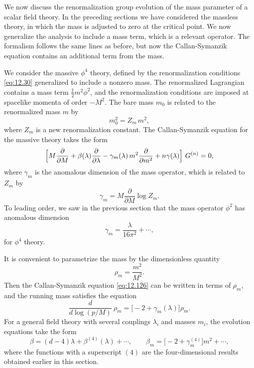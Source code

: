 We now discuss the renormalization group evolution of the mass parameter of a
scalar field theory.  In the preceding sections we have considered the
massless theory, in which the mass is adjusted to zero at the critical point.
We now generalize the analysis to include a mass term, which is a relevant
operator.  The formalism follows the same lines as before, but now the
Callan-Symanzik equation contains an additional term from the mass.

We consider the massive $\phi^4$ theory, defined by the renormalization
conditions \eqref{eq:12.30} generalized to include a nonzero mass.  The
renormalized Lagrangian contains a mass term $\tfrac{1}{2}m^2\phi^2$, and the
renormalization conditions are imposed at spacelike momenta of order $-M^2$.
The bare mass $m_0$ is related to the renormalized mass $m$ by
\begin{equation}
  m_0^2 = Z_m\,m^2 ,
\end{equation}
where $Z_m$ is a new renormalization constant.  The Callan-Symanzik equation
for the massive theory takes the form
\begin{equation}
  \Bigl[ M\frac{\partial}{\partial M} + \beta(\lambda)\frac{\partial}
    {\partial\lambda} - \gamma_m(\lambda)\,m^2\frac{\partial}{\partial m^2}
    + n\gamma(\lambda) \Bigr]\ G^{(n)} = 0 ,
  \label{eq:12.126}
\end{equation}
where $\gamma_m$ is the anomalous dimension of the mass operator, which is
related to $Z_m$ by
\begin{equation}
  \gamma_m = M\frac{\partial}{\partial M}\log Z_m .
\end{equation}
To leading order, we saw in the previous section that the mass operator
$\phi^2$ has anomalous dimension
\begin{equation}
  \gamma_m = \frac{\lambda}{16\pi^2} + \cdots ,
  \label{eq:12.127}
\end{equation}
for $\phi^4$ theory.

It is convenient to parametrize the mass by the dimensionless quantity
\begin{equation}
  \rho_m = \frac{m^2}{M^2} .
\end{equation}
Then the Callan-Symanzik equation \eqref{eq:12.126} can be written in terms
of $\rho_m$, and the running mass satisfies the equation
\begin{equation}
  \frac{d}{d\log(p/M)}\ \rho_m = \bigl[ -2 + \gamma_m(\lambda) \bigr]\rho_m .
  \label{eq:12.131}
\end{equation}
For a general field theory with several couplings $\lambda_i$ and masses
$m_i$, the evolution equations take the form
\begin{equation}
  \beta = (d-4)\lambda + \beta^{(4)}(\lambda) + \cdots,\qquad
  \beta_m = \bigl[ -2 + \gamma_m^{(4)} \bigr]m^2 + \cdots ,
  \label{eq:12.132}
\end{equation}
where the functions with a superscript $(4)$ are the four-dimensional results
obtained earlier in this section.

